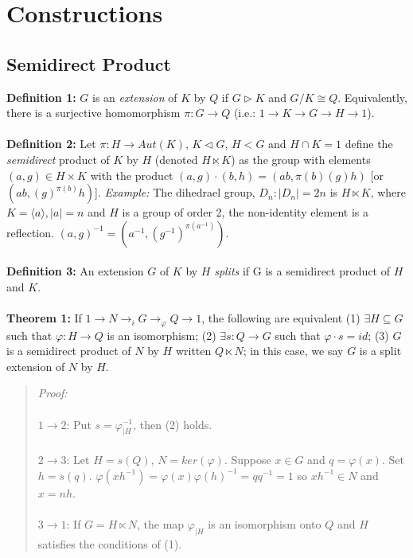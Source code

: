 \chapter{Constructions}
\section {Semidirect Product}
{\bf Definition 1:}
$G$ is an \emph{extension} of $K$ by $Q$ if $G \triangleright K$ and $G/K \cong Q$.  Equivalently,
there is a surjective homomorphism $\pi:G \rightarrow Q$ (i.e.: $1 \rightarrow K \rightarrow G \rightarrow H \rightarrow 1$).
\\
\\
{\bf Definition 2:}
Let $\pi: H \rightarrow Aut(K)$, $K \lhd G$, $H<G$ and $H \cap K = 1$ define the
\emph {semidirect} product of $K$ by $H$ (denoted $H \ltimes K$) as the group with elements
$(a, g) \in H \times K$ with the product $(a, g) \cdot (b, h)= (ab, \pi(b)(g)h)$ [or $(ab, (g)^{\pi(b)}h)$].
\emph{Example:} The dihedrael group, $D_n : |D_n|=2n$ is $H \ltimes K$, where $K= \langle a \rangle, |a|=n$ and
$H$ is a group of order 2, the non-identity element is a reflection.  $(a, g)^{-1} = (a^{-1}, (g^{-1})^{\pi(a^{-1})})$.
\\
\\
{\bf Definition 3:} An extension $G$ of $K$ by $H$ \emph {splits} if G is a semidirect product of $H$ and $K$.
\\
\\
{\bf Theorem 1:}
If $1 \rightarrow N \rightarrow_{i} G \rightarrow_{\varphi} Q \rightarrow 1$, the following
are equivalent
(1) $\exists H \subseteq G$ such that $\varphi: H \rightarrow Q$ is an isomorphism;
(2) $\exists s:Q \rightarrow G$ such that $\varphi \cdot s = id$;
(3) $G$ is a semidirect product of $N$ by $H$ written $Q \ltimes N$; in this
case, we say $G$ is a split extension of $N$ by $H$.
\begin{quote}
\emph{Proof:}
\\
\\
$1 \rightarrow 2$:
Put $s= \varphi_{|H}^{-1}$, then (2) holds.
\\
\\
$2 \rightarrow 3$:
Let $H= s(Q)$, $N= ker(\varphi)$.  Suppose $x \in G$ and $q= \varphi(x)$.  Set
$h= s(q)$.  $\varphi(x h^{-1})= \varphi(x) \varphi(h)^{-1} = q q^{-1}= 1$ so
$x h^{-1} \in N$ and $x= nh$.
\\
\\
$3 \rightarrow 1$:
If $G= H \ltimes N$, the map $\varphi_{|H}$ is an isomorphism onto $Q$ and $H$ satisfies the
conditions of (1).
\end{quote}
